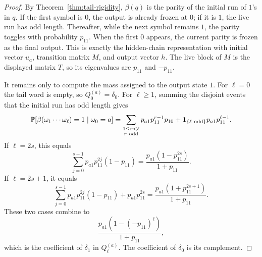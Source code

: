 \begin{proof}
By Theorem~\ref{thm:tail-rigidity}, $\beta(q)$ is the parity of the initial
run of $1$'s in $q$.  If the first symbol is $0$, the output is already frozen
at $0$; if it is $1$, the live run has odd length.  Thereafter, while the next
symbol remains $1$, the parity toggles with probability $p_{11}$.  When the
first $0$ appears, the current parity is frozen as the final output.  This is
exactly the hidden-chain representation with initial vector $u_a$, transition
matrix $M$, and output vector $h$.  The live block of $M$ is the displayed
matrix $T$, so its eigenvalues are $p_{11}$ and $-p_{11}$.

It remains only to compute the mass assigned to the output state $1$.  For
$\ell=0$ the tail word is empty, so $Q_0^{(a)}=\delta_0$.  For $\ell\ge 1$,
summing the disjoint events that the initial run has odd length gives
\[
\mathbb{P}[\beta(\omega_1\cdots\omega_\ell)=1\mid \omega_0=a]
=
\sum_{\substack{1\le r<\ell\\ r\ {\rm odd}}}
p_{a1}p_{11}^{r-1}p_{10}
+
\mathbf{1}_{\{\ell\ {\rm odd}\}}p_{a1}p_{11}^{\ell-1}.
\]
If $\ell=2s$, this equals
\[
\sum_{j=0}^{s-1}p_{a1}p_{11}^{2j}(1-p_{11})
=
\frac{p_{a1}(1-p_{11}^{2s})}{1+p_{11}}.
\]
If $\ell=2s+1$, it equals
\[
\sum_{j=0}^{s-1}p_{a1}p_{11}^{2j}(1-p_{11})
+p_{a1}p_{11}^{2s}
=
\frac{p_{a1}(1+p_{11}^{2s+1})}{1+p_{11}}.
\]
These two cases combine to
\[
\frac{p_{a1}(1-(-p_{11})^\ell)}{1+p_{11}},
\]
which is the coefficient of $\delta_1$ in $Q_\ell^{(a)}$.  The coefficient of
$\delta_0$ is its complement.
\end{proof}

